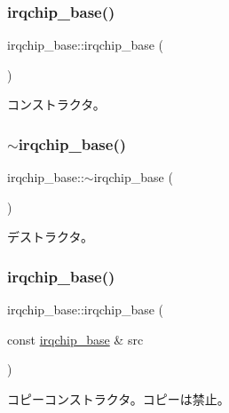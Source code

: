 \subsubsection{\texorpdfstring{irqchip\+\_\+base()}{irqchip\_base()}\hspace{0.1cm}{\footnotesize\ttfamily [1/3]}}
{\footnotesize\ttfamily irqchip\+\_\+base\+::irqchip\+\_\+base (\begin{DoxyParamCaption}{ }\end{DoxyParamCaption})}

コンストラクタ。 \hypertarget{classirqchip__base_a7ec681fa10454a099ec56bd41f6e2f43}{}\label{classirqchip__base_a7ec681fa10454a099ec56bd41f6e2f43} 
\subsubsection{\texorpdfstring{$\sim$irqchip\+\_\+base()}{~irqchip\_base()}}
{\footnotesize\ttfamily irqchip\+\_\+base\+::$\sim$irqchip\+\_\+base (\begin{DoxyParamCaption}{ }\end{DoxyParamCaption})\hspace{0.3cm}{\ttfamily [virtual]}}

デストラクタ。 \hypertarget{classirqchip__base_ab07d75a71ef13af774fd71b176c375e8}{}\label{classirqchip__base_ab07d75a71ef13af774fd71b176c375e8} 
\subsubsection{\texorpdfstring{irqchip\+\_\+base()}{irqchip\_base()}\hspace{0.1cm}{\footnotesize\ttfamily [2/3]}}
{\footnotesize\ttfamily irqchip\+\_\+base\+::irqchip\+\_\+base (\begin{DoxyParamCaption}\item[{const \hyperlink{classirqchip__base}{irqchip\+\_\+base} \&}]{src }\end{DoxyParamCaption})\hspace{0.3cm}{\ttfamily [delete]}}

コピーコンストラクタ。コピーは禁止。 \hypertarget{classirqchip__base_a903392a762dd05199663effcb6b88512}{}\label{classirqchip__base_a903392a762dd05199663effcb6b88512} 
